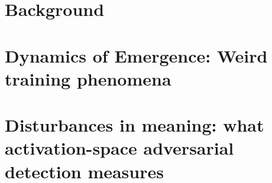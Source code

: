 ﻿\documentclass[ppgc,tese,english]{iiufrgs}
\begin{document}
%     

\chapter{Background}
    \label{chpt:background}
    

\chapter{Dynamics of Emergence: Weird training phenomena}%
    \label{chpt:learning_phenomena}
    

\chapter{Disturbances in meaning: what activation-space adversarial detection measures}
    \label{chpt:interp_adv}
    


%     

%     
\end{document}
